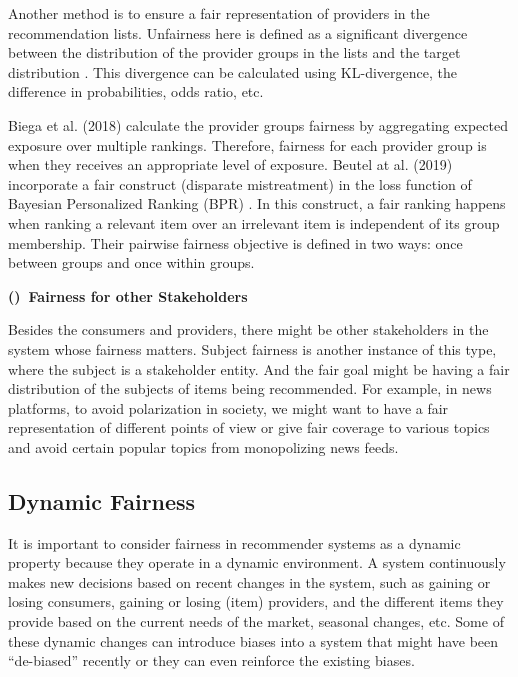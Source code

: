                 Another method is to ensure a fair representation of providers in the recommendation lists. Unfairness here is defined as a significant divergence between the distribution of the provider groups in the lists and the target distribution \cite{yang2017measuring,das2019conceptual}. This divergence can be calculated using KL-divergence, the difference in probabilities, odds ratio, etc. 
                
                Biega et al. (2018) \cite{biega2018equity} calculate the provider groups fairness by aggregating expected exposure over multiple rankings. Therefore, fairness for each provider group is when they receives an appropriate level of exposure. Beutel at al. (2019) \cite{beutel2019fairness} incorporate a fair construct (disparate mistreatment) in the loss function of Bayesian Personalized Ranking (BPR) \cite{rendlebpr2009}. In this construct, a fair ranking happens when ranking a relevant item over an irrelevant item is independent of its group membership. Their pairwise fairness objective is defined in two ways: once between groups and once within groups.


        \textbf{()~Fairness for other Stakeholders}
            
            Besides the consumers and providers, there might be other stakeholders in the system whose fairness matters. Subject fairness is another instance of this type, where the subject is a stakeholder entity. And the fair goal might be having a fair distribution of the subjects of items being recommended. For example, in news platforms, to avoid polarization in society, we might want to have a fair representation of different points of view or give fair coverage to various topics and avoid certain popular topics from monopolizing news feeds.


    \subsection{Dynamic Fairness}

        It is important to consider fairness in recommender systems as a dynamic property because they operate in a dynamic environment. A system continuously makes new decisions based on recent changes in the system, such as gaining or losing consumers, gaining or losing (item) providers, and the different items they provide based on the current needs of the market, seasonal changes, etc. Some of these dynamic changes can introduce biases into a system that might have been ``de-biased'' recently or they can even reinforce the existing biases. 
        
